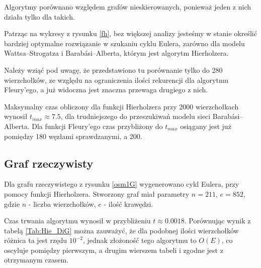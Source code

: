 \documentclass[a4paper, 12pt, twoside, openright]{article}
\begin{document}
\par\indent

	Algorytmy porównano względem grafów nieskierowanych, ponieważ jeden z nich działa tylko dla takich.
	
	Patrząc na wykresy z rysunku \ref{fh}, bez większej analizy jesteśmy w stanie określić bardziej optymalne rozwiązanie w szukaniu cyklu Eulera, zarówno dla modelu Wattsa–Strogatza i Barabási–Alberta, którym jest algorytm Hierholzera. 
	
	Należy wziąć pod uwagę, że przedstawiono tu porównanie tylko do 280 wierzchołków, ze względu na ograniczenia ilości rekurencji dla algorytmu Fleury'ego, a już widoczna jest znaczna przewaga drugiego z nich.
	

	
	
	Maksymalny czas obliczony dla funkcji Hierholzera przy 2000 wierzchołkach wynosił $t_{max} \approx 7.5$, dla trudniejszego do przeszukiwań modelu sieci Barabási–Alberta. Dla funkcji Fleury'ego czas przybliżony do $t_{max}$ osiągany jest już pomiędzy 180 węzłami sprawdzanymi, a 200.
	


\subsection{Graf rzeczywisty}
\par\indent

Dla grafu rzeczywistego z rysunku \ref{osm1G} wygenerowano cykl Eulera, przy pomocy funkcji Hierholzera. Stworzony graf miał parametry $n=211$, $e=852$, gdzie $n$ - liczba wierzchołków, $e$ - ilość krawędzi. 

Czas trwania algorytmu wynosił w przybliżeniu $t\approx0.0018$. Porównując wynik z tabelą \ref{Tab:Hie_DiG} można zauważyć, że dla podobnej ilości wierzchołków różnica ta jest rzędu $10^{-2}$, jednak złożoność tego algorytmu to $O(E)$, co oscyluje pomiędzy pierwszym, a drugim wierszem tabeli i zgodne jest z otrzymanym czasem.
\end{document}
